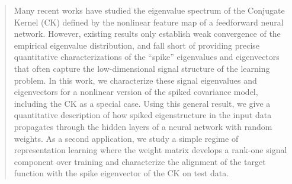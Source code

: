 \begin{abstract}

Many recent works have studied the eigenvalue spectrum of the Conjugate Kernel
(CK) defined by the nonlinear feature map of a feedforward neural network.
However, existing results only establish weak convergence of the empirical
eigenvalue distribution, and fall short of providing precise quantitative
characterizations of the ``spike'' eigenvalues and eigenvectors that
often capture the low-dimensional signal structure of the 
learning problem. In this work, we characterize these signal eigenvalues and
eigenvectors for a nonlinear version of the spiked covariance model,
including the CK as a special case. Using this general result, we give
a quantitative description of how spiked eigenstructure in the input data
propagates through the hidden layers of a neural network with random weights.
As a second application, we study a simple regime of representation learning
where the weight matrix develops a rank-one signal component over training
and characterize the alignment of the target function with the spike
eigenvector of the CK on test data.

\end{abstract}
